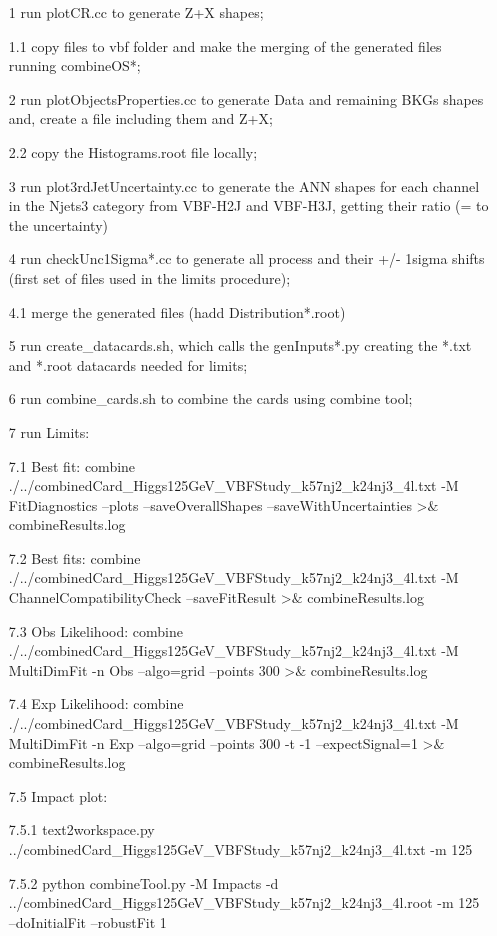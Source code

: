 \documentclass[]{report}
\begin{document}
\begin{itemize}
\item[1] run plotCR.cc to generate Z+X shapes;
\item[1.1] copy files to vbf folder and make the merging of the generated files running combineOS*;
\item[2] run plotObjectsProperties.cc to generate Data and remaining BKGs shapes and, create a file including them and Z+X;
\item[2.2] copy the Histograms.root file locally;
\item[3] run plot3rdJetUncertainty.cc to generate the ANN shapes for each channel in the Njets3 category from VBF-H2J and VBF-H3J, getting their ratio (= to the uncertainty)
\item[4] run checkUnc1Sigma*.cc to generate all process and their +/- 1sigma shifts (first set of files used in the limits procedure);
\item[4.1] merge the generated files (hadd Distribution*.root)
\item[5] run create\_datacards.sh, which calls the genInputs*.py creating the *.txt and *.root datacards needed for limits;
\item[6] run combine\_cards.sh to combine the cards using combine tool;
\item[7] run Limits:
\item[7.1] Best fit: combine ./../combinedCard\_Higgs125GeV\_VBFStudy\_k57nj2\_k24nj3\_4l.txt -M FitDiagnostics --plots --saveOverallShapes --saveWithUncertainties >$\&$ combineResults.log
\item[7.2] Best fits: combine ./../combinedCard\_Higgs125GeV\_VBFStudy\_k57nj2\_k24nj3\_4l.txt -M ChannelCompatibilityCheck --saveFitResult >$\&$ combineResults.log
\item[7.3] Obs Likelihood: combine ./../combinedCard\_Higgs125GeV\_VBFStudy\_k57nj2\_k24nj3\_4l.txt -M MultiDimFit -n Obs --algo=grid --points 300 >$\&$ combineResults.log
\item[7.4] Exp Likelihood: combine ./../combinedCard\_Higgs125GeV\_VBFStudy\_k57nj2\_k24nj3\_4l.txt -M MultiDimFit -n Exp --algo=grid --points 300 -t -1 --expectSignal=1 >$\&$ combineResults.log
\item[7.5] Impact plot:
\item[7.5.1] text2workspace.py ../combinedCard\_Higgs125GeV\_VBFStudy\_k57nj2\_k24nj3\_4l.txt -m 125
\item[7.5.2] python combineTool.py -M Impacts -d ../combinedCard\_Higgs125GeV\_VBFStudy\_k57nj2\_k24nj3\_4l.root -m 125 --doInitialFit --robustFit 1

\end{itemize}
\end{document}
